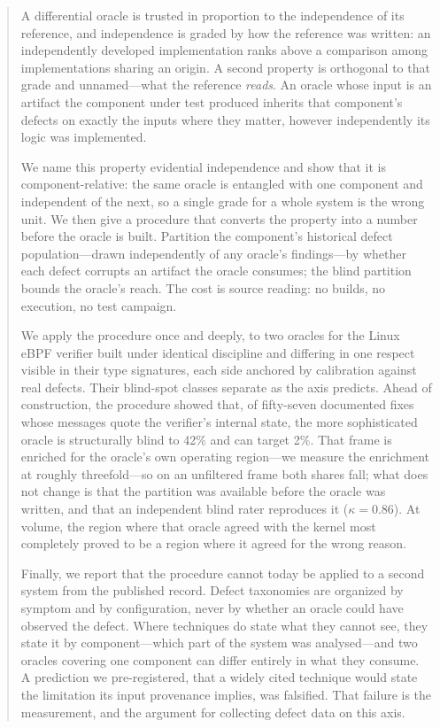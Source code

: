 \documentclass[sigconf,review,anonymous]{acmart}
\begin{document}
\begin{abstract}
A differential oracle is trusted in proportion to the independence of its reference,
and independence is graded by how the reference was written: an independently
developed implementation ranks above a comparison among implementations sharing an
origin. A second property is orthogonal to that grade and unnamed---what the
reference \emph{reads}. An oracle whose input is an artifact the component under test
produced inherits that component's defects on exactly the inputs where they matter,
however independently its logic was implemented.

We name this property evidential independence and show that it is
component-relative: the same oracle is entangled with one component and independent
of the next, so a single grade for a whole system is the wrong unit. We then give a
procedure that converts the property into a number before the oracle is built.
Partition the component's historical defect population---drawn independently of any
oracle's findings---by whether each defect corrupts an artifact the oracle consumes;
the blind partition bounds the oracle's reach. The cost is source reading: no builds,
no execution, no test campaign.

We apply the procedure once and deeply, to two oracles for the Linux eBPF verifier
built under identical discipline and differing in one respect visible in their type
signatures, each side anchored by calibration against real defects. Their blind-spot
classes separate as the axis predicts. Ahead of construction, the procedure showed
that, of fifty-seven documented fixes whose messages quote the verifier's internal
state, the more sophisticated oracle is structurally blind to 42\% and can target
2\%. That frame is enriched for the oracle's own operating region---we measure the
enrichment at roughly threefold---so on an unfiltered frame both shares fall; what
does not change is that the partition was available before the oracle was written,
and that an independent blind rater reproduces it ($\kappa = 0.86$). At volume, the
region where that oracle agreed with the kernel most completely proved to be a region
where it agreed for the wrong reason.

Finally, we report that the procedure cannot today be applied to a second system from
the published record. Defect taxonomies are organized by symptom and by
configuration, never by whether an oracle could have observed the defect. Where
techniques do state what they cannot see, they state it by component---which part of
the system was analysed---and two oracles covering one component can differ entirely
in what they consume. A prediction we pre-registered, that a widely cited technique
would state the limitation its input provenance implies, was falsified. That failure
is the measurement, and the argument for collecting defect data on this axis.
\end{abstract}
\end{document}
